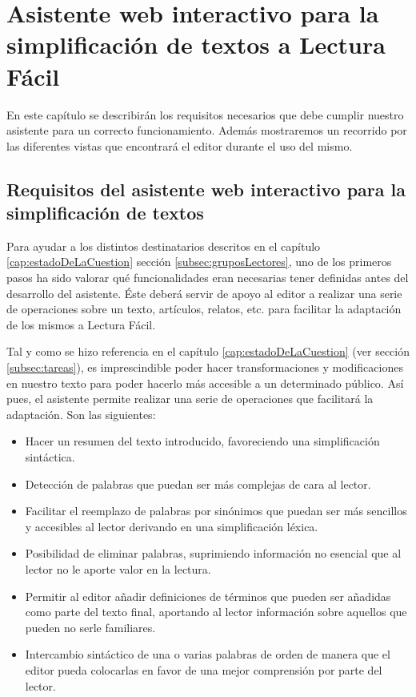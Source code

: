 \chapter{Asistente web interactivo para la simplificación de textos a Lectura Fácil}
\label{cap:asistenteWeb}



En este capítulo se describirán los requisitos necesarios que debe cumplir nuestro asistente para un correcto funcionamiento. Además mostraremos un recorrido por las diferentes vistas que encontrará el editor durante el uso del mismo.



\section{Requisitos del asistente web interactivo para la simplificación de textos}\label{sec:requisitosAplicacion}

Para ayudar a los distintos destinatarios descritos en el capítulo \ref{cap:estadoDeLaCuestion} sección \ref{subsec:gruposLectores}, uno de los primeros pasos ha sido valorar qué funcionalidades eran necesarias tener definidas antes del desarrollo del asistente. Éste deberá servir de apoyo al editor a realizar una serie de operaciones sobre un texto, artículos, relatos, etc. para facilitar la adaptación de los mismos a Lectura Fácil.

Tal y como se hizo referencia en el capítulo \ref{cap:estadoDeLaCuestion} (ver sección \ref{subsec:tareas}), es imprescindible poder hacer transformaciones y modificaciones en nuestro texto para poder hacerlo más accesible a un determinado público. Así pues, el asistente permite realizar una serie de operaciones que facilitará la adaptación. Son las siguientes:

\begin{itemize}
	
	\item Hacer un resumen del texto introducido, favoreciendo una simplificación sintáctica.
	\item  Detección de palabras que puedan ser más complejas de cara al lector.
	\item Facilitar el reemplazo de palabras por sinónimos que puedan ser más sencillos y accesibles al lector derivando en una simplificación léxica.
	\item Posibilidad de eliminar palabras, suprimiendo información no esencial que al lector no le aporte valor en la lectura.
	\item Permitir al editor añadir definiciones de términos que pueden ser añadidas como parte del texto final, aportando al lector información sobre aquellos que pueden no serle familiares.
	\item  Intercambio sintáctico de una o varias palabras de orden de manera que el editor pueda colocarlas en favor de una mejor comprensión por parte del lector.
\end{itemize}

